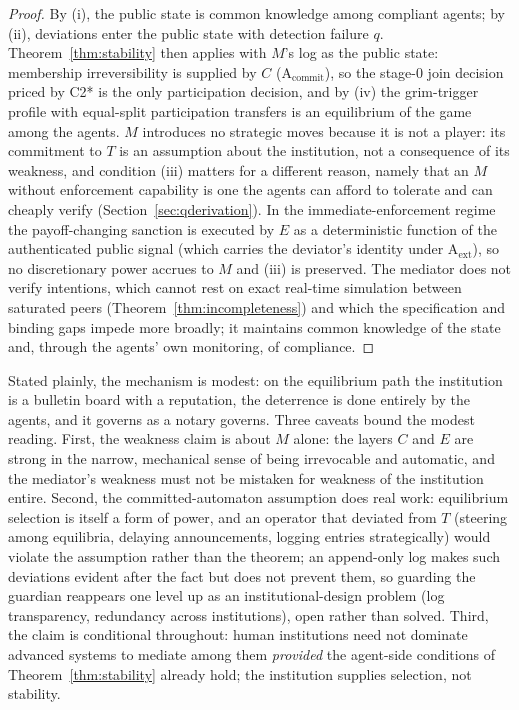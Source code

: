 \documentclass[manuscript,screen,review]{jair}
\begin{document}
\begin{proof}
By (i), the public state is common knowledge among compliant agents; by (ii), deviations enter the public state with detection failure $q$. Theorem~\ref{thm:stability} then applies with $M$'s log as the public state: membership irreversibility is supplied by $C$ (A$_{\mathrm{commit}}$), so the stage-0 join decision priced by C2* is the only participation decision, and by (iv) the grim-trigger profile with equal-split participation transfers is an equilibrium of the game among the agents. $M$ introduces no strategic moves because it is not a player: its commitment to $T$ is an assumption about the institution, not a consequence of its weakness, and condition (iii) matters for a different reason, namely that an $M$ without enforcement capability is one the agents can afford to tolerate and can cheaply verify (Section~\ref{sec:qderivation}). In the immediate-enforcement regime the payoff-changing sanction is executed by $E$ as a deterministic function of the authenticated public signal (which carries the deviator's identity under A$_{\mathrm{ext}}$), so no discretionary power accrues to $M$ and (iii) is preserved. The mediator does not verify intentions, which cannot rest on exact real-time simulation between saturated peers (Theorem~\ref{thm:incompleteness}) and which the specification and binding gaps impede more broadly; it maintains common knowledge of the state and, through the agents' own monitoring, of compliance.
\end{proof}

Stated plainly, the mechanism is modest: on the equilibrium path the institution is a bulletin board with a reputation, the deterrence is done entirely by the agents, and it governs as a notary governs. Three caveats bound the modest reading. First, the weakness claim is about $M$ alone: the layers $C$ and $E$ are strong in the narrow, mechanical sense of being irrevocable and automatic, and the mediator's weakness must not be mistaken for weakness of the institution entire. Second, the committed-automaton assumption does real work: equilibrium selection is itself a form of power, and an operator that deviated from $T$ (steering among equilibria, delaying announcements, logging entries strategically) would violate the assumption rather than the theorem; an append-only log makes such deviations evident after the fact but does not prevent them, so guarding the guardian reappears one level up as an institutional-design problem (log transparency, redundancy across institutions), open rather than solved. Third, the claim is conditional throughout: human institutions need not dominate advanced systems to mediate among them \emph{provided} the agent-side conditions of Theorem~\ref{thm:stability} already hold; the institution supplies selection, not stability.
\end{document}
